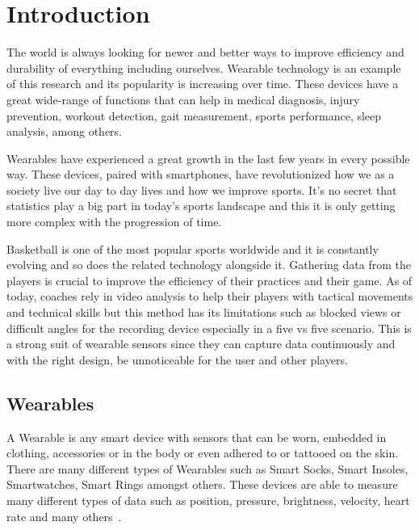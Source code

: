 

%

\chapter{Introduction}
\label{cha:introduction}

The world is always looking for newer and better ways to improve efficiency and durability of everything including ourselves. Wearable technology is an example of this research and its popularity is increasing over time. 
These devices have a great wide-range of functions that can help in medical diagnosis, injury prevention, workout detection, gait measurement, sports performance, sleep analysis, among others.

Wearables have experienced a great growth in the last few years in every possible way. These devices, paired with smartphones, have revolutionized how we as a society live our day to day lives and how 
we improve sports. It's no secret that statistics play a big part in today's sports landscape and this it is only getting more complex with the progression of time.

Basketball is one of the most popular sports worldwide and it is constantly evolving and so does the related technology alongside it. Gathering data from the players is crucial 
to improve the efficiency of their practices and their game. As of today, coaches rely in video analysis to help their players with tactical movements and technical skills but this method has its 
limitations such as blocked views or difficult angles for the recording device especially in a five vs five scenario. This is a strong suit of wearable sensors since they can capture data
continuously and with the right design, be unnoticeable for the user and other players.

\newpage

\section{Wearables}
\label{sec:wearables}
A Wearable is any smart device with sensors that can be worn, embedded in clothing, accessories or in the body or even adhered to or tattooed on the skin. There are many different 
types of Wearables such as Smart Socks, Smart Insoles, Smartwatches, Smart Rings amongst others. These devices are able to measure many different types of data such as position, pressure, 
brightness, velocity, heart rate and many others~\cite{reviewWearableTech}.

